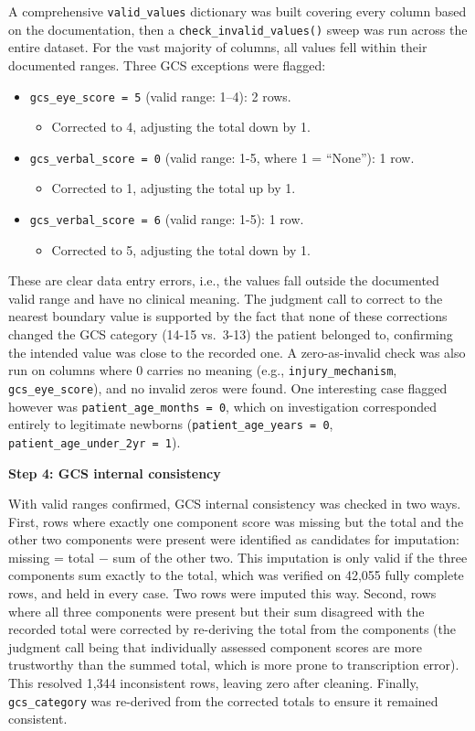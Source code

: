 \documentclass[11pt,letterpaper]{article}
\begin{document}
A comprehensive \texttt{valid\_values} dictionary was built covering every column based on the documentation, then a \texttt{check\_invalid\_values()} sweep was run across the entire dataset. For the vast majority of columns, all values fell within their documented ranges. Three GCS exceptions were flagged:
\begin{itemize}
    \item \texttt{gcs\_eye\_score = 5} (valid range: 1--4): 2 rows. 
    \begin{itemize}
        \item Corrected to 4, adjusting the total down by 1.
    \end{itemize}
    \item \texttt{gcs\_verbal\_score = 0} (valid range: 1-5, where 
    1 = ``None''): 1 row. 
    \begin{itemize}
        \item Corrected to 1, adjusting the total up by 1.
    \end{itemize}
    \item \texttt{gcs\_verbal\_score = 6} (valid range: 1-5): 1 row. 
    \begin{itemize}
        \item Corrected to 5, adjusting the total down by 1.
    \end{itemize}
\end{itemize}

These are clear data entry errors, i.e., the values fall outside the documented valid range and have no clinical meaning. The judgment call to correct to the nearest boundary value is supported by the fact that none of these corrections changed the GCS category (14-15 vs.\ 3-13) the patient belonged to, confirming the intended value was close to the recorded one. A zero-as-invalid check was also run on columns where 0 carries no meaning (e.g., \texttt{injury\_mechanism}, \texttt{gcs\_eye\_score}), and no invalid zeros were found. One interesting case flagged however was \texttt{patient\_age\_months = 0}, which on investigation corresponded entirely to legitimate newborns (\texttt{patient\_age\_years = 0}, \texttt{patient\_age\_under\_2yr = 1}).

\textbf{Step 4: GCS internal consistency}

With valid ranges confirmed, GCS internal consistency was checked in two ways. First, rows where exactly one component score was missing but the total and the other two components were present were identified as candidates for imputation: missing = total $-$ sum of the other two. This imputation is only valid if the three components sum exactly to the total, which was verified on 42,055 fully complete rows, and held in every case. Two rows were imputed this way. Second, rows where all three components were present but their sum disagreed with the recorded total were corrected by re-deriving the total from the components (the judgment call being that individually assessed component scores are more trustworthy than the summed total, which is more prone to transcription error). This resolved 1,344 inconsistent rows, leaving zero after cleaning. Finally, \texttt{gcs\_category} was re-derived from the corrected totals to ensure it remained consistent.
\end{document}
